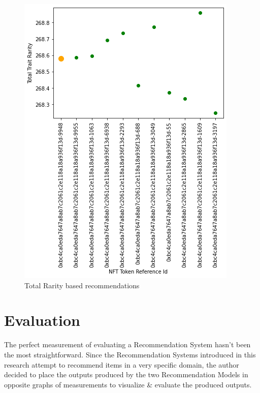 \documentclass[conference]{IEEEtran}
\begin{document}
\begin{figure}[htbp]
\centerline{\includegraphics[width=\linewidth]{images/Trait_rarity_representation_graph-rarity_recommendations.png}}
\caption{Total Rarity based recommendations}
\label{fig:total-rarity-output}
\end{figure}

\section{Evaluation}
The perfect measurement of evaluating a Recommendation System hasn't been the most straightforward. Since the Recommendation Systems introduced in this research attempt to recommend items in a very specific domain, the author decided to place the outputs produced by the two Recommendation Models in opposite graphs of measurements to visualize \& evaluate the produced outputs.
\end{document}
